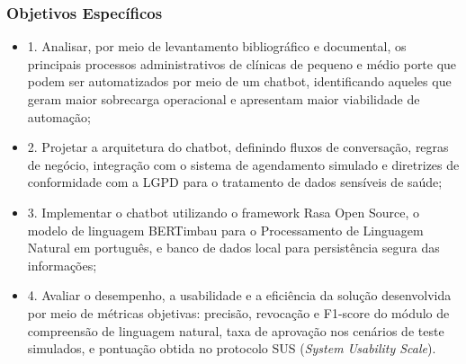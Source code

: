 \documentclass[12pt,a4paper]{extarticle}
\begin{document}
\subsubsection{Objetivos Específicos}


\begin{itemize}
    \item 1. Analisar, por meio de levantamento bibliográfico e documental, os principais processos administrativos de clínicas de pequeno e médio porte que podem ser automatizados por meio de um chatbot, identificando aqueles que geram maior sobrecarga operacional e apresentam maior viabilidade de automação;
    \item 2. Projetar a arquitetura do chatbot, definindo fluxos de conversação, regras de negócio, integração com o sistema de agendamento simulado e diretrizes de conformidade com a LGPD para o tratamento de dados sensíveis de saúde;
    \item 3. Implementar o chatbot utilizando o framework Rasa Open Source, o modelo de linguagem BERTimbau para o Processamento de Linguagem Natural em português, e banco de dados local para persistência segura das informações;
    \item 4. Avaliar o desempenho, a usabilidade e a eficiência da solução desenvolvida por meio de métricas objetivas: precisão, revocação e F1-score do módulo de compreensão de linguagem natural, taxa de aprovação nos cenários de teste simulados, e pontuação obtida no protocolo SUS (\textit{System Usability Scale}).
\end{itemize}
\end{document}
